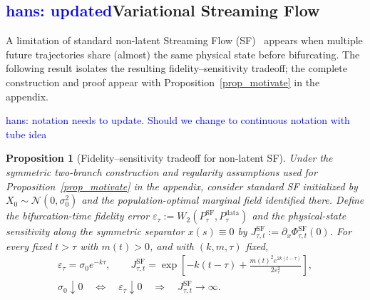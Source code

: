 \documentclass{article} %
\newtheorem{vsfproposition}[vsftheorem]{Proposition}
\numberwithin{equation}{section}
\newcommand{\hans}[1]{\textcolor{blue}{hans: #1}}
\begin{document}




\subsection{\hans{updated}Variational Streaming Flow}
\label{sec:variational-streaming-flow}


A limitation of standard non-latent Streaming Flow (SF)~\citep{jiang2025streaming}
appears when multiple future trajectories share (almost) the same physical
state before bifurcating. The following result isolates the resulting
fidelity--sensitivity tradeoff; the complete construction and proof appear with
Proposition~\ref{prop_motivate} in the appendix.

\hans{notation needs to update. Should we change to continuous notation with tube idea}
\begin{vsfproposition}[Fidelity--sensitivity tradeoff for non-latent SF]
\label{prop:sf_tradeoff_summary}
Under the symmetric two-branch construction and regularity assumptions used
for Proposition~\ref{prop_motivate} in the appendix, consider standard SF
initialized by $X_0\sim\mathcal N(0,\sigma_0^2)$ and the population-optimal
marginal field identified there. Define the bifurcation-time fidelity error
$\varepsilon_\tau:=W_2(P_\tau^{\mathrm{SF}},P_\tau^{\mathrm{data}})$ and the
physical-state sensitivity along the symmetric separator $x(s)\equiv0$ by
$J_{\tau,t}^{\mathrm{SF}}:=\partial_x\Phi_{\tau,t}^{\mathrm{SF}}(0)$. For
every fixed $t>\tau$ with $m(t)>0$, and with $(k,m,\tau)$ fixed,
\begin{equation}
    \begin{gathered}
        \varepsilon_\tau=\sigma_0e^{-k\tau},
        \qquad
        J_{\tau,t}^{\mathrm{SF}}
        =
        \exp\!\left[
            -k(t-\tau)
            +
            \frac{m(t)^2e^{2k(t-\tau)}}{2\varepsilon_\tau^2}
        \right],
        \\
        \sigma_0\downarrow0
        \quad\Longleftrightarrow\quad
        \varepsilon_\tau\downarrow0
        \quad\Longrightarrow\quad
        J_{\tau,t}^{\mathrm{SF}}\to\infty.
    \end{gathered}
    \label{eq:bifurcation_tradeoff_summary}
\end{equation}
\end{vsfproposition}
\end{document}
